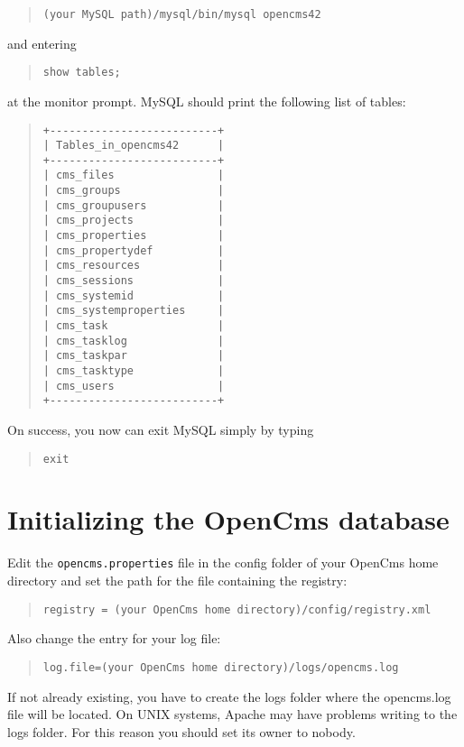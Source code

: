 \begin{quote}
\texttt{(your MySQL path)/mysql/bin/mysql opencms42}
\end{quote}

and entering 
\begin{quote}
\texttt{show tables;}
\end{quote}
at the monitor prompt. MySQL should print the following list of tables: 

\begin{quote}
\begin{verbatim}
+--------------------------+
| Tables_in_opencms42      |
+--------------------------+
| cms_files                |
| cms_groups               |
| cms_groupusers           |
| cms_projects             |
| cms_properties           |
| cms_propertydef          |
| cms_resources            |
| cms_sessions             |
| cms_systemid             |
| cms_systemproperties     |
| cms_task                 |
| cms_tasklog              |
| cms_taskpar              |
| cms_tasktype             |
| cms_users                |
+--------------------------+
\end{verbatim}
\end{quote}

On success, you now can exit MySQL simply by typing
\begin{quote}
\texttt{exit}
\end{quote}

\section{Initializing the OpenCms database}
Edit the \texttt{opencms.properties} file in the config folder of your OpenCms home 
directory and set the path for the file containing the registry:

\begin{quote}
\texttt{registry = (your OpenCms home directory)/config/registry.xml}
\end{quote}

Also change the entry for your log file:

\begin{quote}
\texttt{log.file=(your OpenCms home directory)/logs/opencms.log}
\end{quote}

If not already existing, you have to create the logs folder where the opencms.log file 
will be located. On UNIX systems, Apache may have problems writing to the logs folder. 
For this reason you should set its owner to nobody. 


